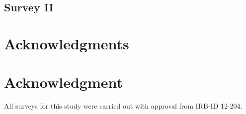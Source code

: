 \subsection*{Survey II}\label{app2}
%
%



\ifCLASSOPTIONcompsoc
  \section*{Acknowledgments}
\else
  \section*{Acknowledgment}
\fi


All surveys for this study were carried out with approval from  IRB-ID 12-204.


